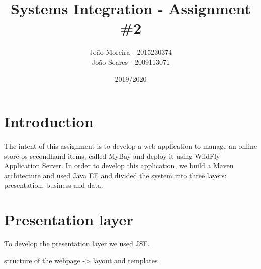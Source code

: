 \documentclass{article}
\title{Systems Integration - Assignment \#2}
\date{2019/2020}
\author{João Moreira - 2015230374 \\ 
João Soares - 2009113071 }
\begin{document}
\maketitle

\section{Introduction}

\qquad The intent of this assignment is to develop a web application to manage an online store os secondhand items, called MyBay and deploy it using WildFly Application Server. In order to develop this application, we build a Maven architecture and used \ac{Java EE} and divided the system into three layers: presentation, business and data.

\section{Presentation layer}

\qquad To develop the presentation layer we used \ac{JSF}.

\qquad structure of the webpage -> layout and templates
\end{document}
